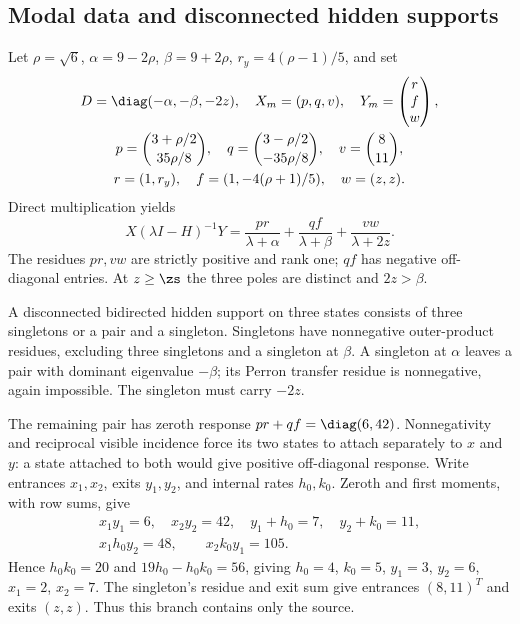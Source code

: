 \subsection{Modal data and disconnected hidden supports}
Let $\rho=\sqrt6$, $\alpha=9-2\rho$, $\beta=9+2\rho$, $r_y=4(\rho-1)/5$, and set
\begin{gather}
 D=\diag(-\alpha,-\beta,-2z),\quad X_m=(p,q,v),\quad
 Y_m=\begin{pmatrix}r\\f\\w\end{pmatrix},\label{eq:modal}\\
 p=\binom{3+\rho/2}{35\rho/8},\quad
 q=\binom{3-\rho/2}{-35\rho/8},\quad v=\binom8{11},\\
 r=(1,r_y),\quad f=(1,-4(\rho+1)/5),\quad w=(z,z).
\end{gather}
Direct multiplication yields
\begin{equation}
 X(\lambda I-H)^{-1}Y
 =\frac{pr}{\lambda+\alpha}+\frac{qf}{\lambda+\beta}+\frac{vw}{\lambda+2z}.\label{eq:residues}
\end{equation}
The residues $pr,vw$ are strictly positive and rank one; $qf$ has negative off-diagonal entries. At $z\ge\zs$ the three poles are distinct and $2z>\beta$.

A disconnected bidirected hidden support on three states consists of three singletons or a pair and a singleton. Singletons have nonnegative outer-product residues, excluding three singletons and a singleton at $\beta$. A singleton at $\alpha$ leaves a pair with dominant eigenvalue $-\beta$; its Perron transfer residue is nonnegative, again impossible. The singleton must carry $-2z$.

The remaining pair has zeroth response $pr+qf=\diag(6,42)$. Nonnegativity and reciprocal visible incidence force its two states to attach separately to $x$ and $y$: a state attached to both would give positive off-diagonal response. Write entrances $x_1,x_2$, exits $y_1,y_2$, and internal rates $h_0,k_0$. Zeroth and first moments, with row sums, give
\begin{gather}
 x_1y_1=6,\quad x_2y_2=42,\quad y_1+h_0=7,\quad y_2+k_0=11,\\
 x_1h_0y_2=48,\qquad x_2k_0y_1=105.
\end{gather}
Hence $h_0k_0=20$ and $19h_0-h_0k_0=56$, giving $h_0=4$, $k_0=5$, $y_1=3$, $y_2=6$, $x_1=2$, $x_2=7$. The singleton's residue and exit sum give entrances $(8,11)^T$ and exits $(z,z)$. Thus this branch contains only the source.


